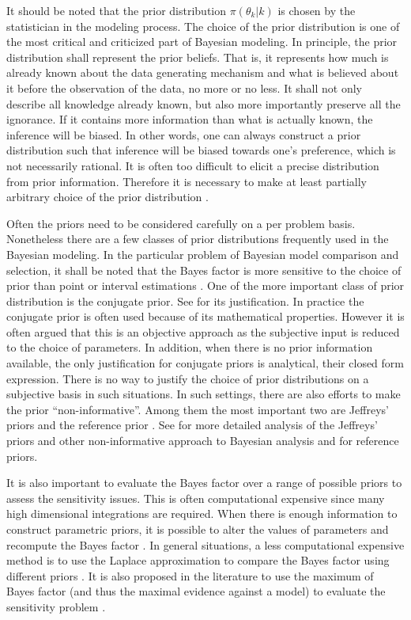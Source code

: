 It should be noted that the prior distribution $\pi(\theta_k|k)$ is
chosen by the statistician in the modeling process. The choice of the prior
distribution is one of the most critical and criticized part of Bayesian
modeling. In principle, the prior distribution shall represent the prior
beliefs. That is, it represents how much is already known about the data
generating mechanism and what is believed about it before the observation of
the data, no more or no less. It shall not only describe all knowledge already
known, but also more importantly preserve all the ignorance. If it contains
more information than what is actually known, the inference will be biased. In
other words, one can always construct a prior distribution such that inference
will be biased towards one's preference, which is not necessarily rational. It
is often too difficult to elicit a precise distribution from prior
information.  Therefore it is necessary to make at least partially arbitrary
choice of the prior distribution
\parencites{Robert:2007tc}[][chap.~3]{Kass:1995vb}.

Often the priors need to be considered carefully on a per problem basis.
Nonetheless there are a few classes of prior distributions frequently used in
the Bayesian modeling. In the particular problem of Bayesian model comparison
and selection, it shall be noted that the Bayes factor is more sensitive to
the choice of prior than point or interval estimations \parencite{Kass:1993vy,
  Kass:1995vb}. One of the more important class of prior distribution is the
conjugate prior. See \textcite[][chap.~5]{Bernardo:1994vd} for its
justification.  In practice the conjugate prior is often used because of its
mathematical properties. However it is often argued that this is an objective
approach as the subjective input is reduced to the choice of parameters. In
addition, when there is no prior information available, the only justification
for conjugate priors is analytical, their closed form expression. There is no
way to justify the choice of prior distributions on a subjective basis in such
situations. In such settings, there are also efforts to make the prior
``non-informative''.  Among them the most important two are Jeffreys' priors
\parencite{Jeffreys:1946jf} and the reference prior
\parencite{Bernardo:1979uq}. See \textcite{Kass:1996jj} for more detailed
analysis of the Jeffreys' priors and other non-informative approach to
Bayesian analysis and \textcite{Berger:1989vj, Berger:1992kf, Berger:1992wo}
for reference priors.

It is also important to evaluate the Bayes factor over a range of possible
priors to assess the sensitivity issues. This is often computational expensive
since many high dimensional integrations are required. When there is enough
information to construct parametric priors, it is possible to alter the values
of parameters and recompute the Bayes factor
\parencite[e.g.,][]{McCulloch:1991hj}. In general situations, a less
computational expensive method is to use the Laplace approximation to compare
the Bayes factor using different priors \parencite[e.g.,][]{Kass:1992tz}. It
is also proposed in the literature to use the maximum of Bayes factor (and
thus the maximal evidence against a model) to evaluate the sensitivity problem
\parencite[e.g.,][]{Berger:1987iq}.

